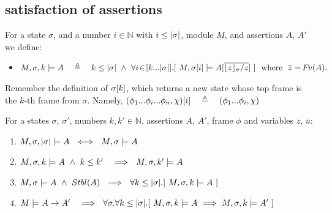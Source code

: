 \subsection{\Scoped satisfaction of assertions}
\label{s:scoped:mean}{

\begin{definition}%
\label{def:restrict}
For a state $\sigma$, and a number $i\in \mathbb{N}$ with $i \leq |\sigma|$,   module $M$, and assertions $A$, $A'$ we define: %
\begin{itemize}
\item
$  \satDAssertFrom M  \sigma k   A  \ \  \ \triangleq \  \ \  
  k\leq  \DepthSt {\sigma} \ \wedge \  \forall i\!\in\![k...\DepthSt {\sigma}].[\ M,{\RestictTo {\sigma}{i}} \models A[\overline{ {{\interpret \sigma z}/ z}}]\ ] \ \  \mbox{where} \ \
  \overline z=\fv(A).$ 
\end{itemize}
\end{definition}
 
 Remember the definition of  $\sigma[k]$, which returns a new state whose top frame is the $k$-th frame from $\sigma$. Namely, $\RestictTo {(\phi_1...\phi_i...\phi_n,\chi)} {i}\ \ \ \triangleq \ \ \ (\phi_1...\phi_i,\chi)$
  
 
\begin{lemma}
\label{l:shallow:scoped}
For a states $\sigma$, $\sigma'$, numbers $k,k'\in \mathbb{N}$, assertions  $A$, $A'$, frame $\phi$ and variables $\overline z$, $\overline u$:
\begin{enumerate}
\item
$ \satDAssertFrom M  \sigma { \DepthSt \sigma}   A \ \ \Longleftrightarrow\ \ M,\sigma \models A\ $
\item
$ \satDAssertFrom M  \sigma {k} A \ \wedge\  k\leq k'\  \  \   \Longrightarrow \ \ \satDAssertFrom M  \sigma {k'} A$ 
\item 
\label{shallow:to:scoped}
$ M,\sigma \models A \ \wedge\ \Stable A \  \ \Longrightarrow \  \  \forall k  \leq  \DepthSt \sigma.[ \ \satDAssertFrom M  \sigma k   A \ ]$
\item
\label{fourSD}
$ M  \models A \rightarrow A'\  \  \   \Longrightarrow \ \ \forall \sigma. \forall k\leq  { \DepthSt \sigma}.[ \ \satDAssertFrom M  \sigma {k} A
\ \Longrightarrow \  \satDAssertFrom M  \sigma {k} A'\ ]$

\end{enumerate}
\end{lemma}
 
}
